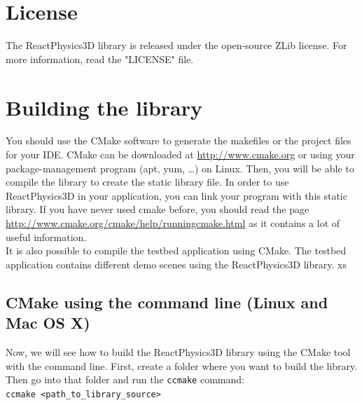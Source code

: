 \documentclass[a4paper,12pt]{article}
\begin{document}
    \section{License}

    The ReactPhysics3D library is released under the open-source ZLib license. For more information, read the "LICENSE" file.

    \section{Building the library}
    \label{sec:building}

    You should use the CMake software to generate the makefiles or the
    project files for your IDE. CMake can be downloaded at
    \url{http://www.cmake.org} or using your package-management program
    (apt, yum, \dots) on Linux. Then, you will be able to compile the library to create the static library
    file. In order to use ReactPhysics3D in your application, you can link your program with this static library.
    If you have never used cmake before, you should read the page \url{http://www.cmake.org/cmake/help/runningcmake.html} as
    it contains a lot of useful information. \\

    It is also possible to compile the testbed application using CMake. The testbed application contains different
    demo scenes using the ReactPhysics3D library.
xs
    \subsection{CMake using the command line (Linux and Mac OS X)}

    Now, we will see how to build the ReactPhysics3D library using the CMake tool with the command line.
    First, create a folder where you want to build the library. Then go into that folder and run
    the \texttt{ccmake} command: \\

    \texttt{ccmake \textless path\_to\_library\_source\textgreater} \\
\end{document}
